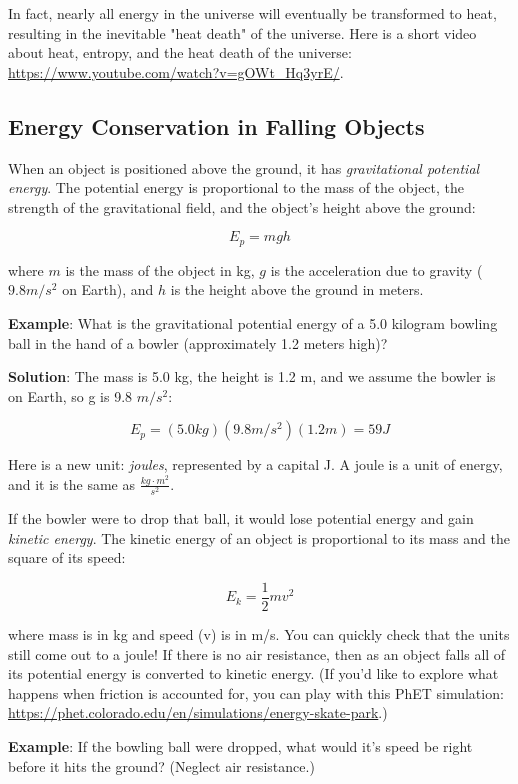 In fact, nearly all energy in the universe will eventually be transformed to heat,
resulting in the inevitable "heat death" of the universe. Here is a short video 
about heat, entropy, and the heat death of the universe: 
\url{https://www.youtube.com/watch?v=gOWt_Hq3yrE/}. 

\subsection{Energy Conservation in Falling Objects}
When an object is positioned above the ground, it has \textit{gravitational 
potential energy}. 
The potential energy is proportional to the mass of the object, the strength of 
the gravitational field, and the object's height above the ground:

$$E_{p} = mgh$$

where $m$ is the mass of the object in kg, $g$ is the acceleration due to gravity 
($9.8 m/s^2$ on Earth), and $h$ is the height above the ground in meters. 

\textbf{Example}: What is the gravitational potential energy of a 5.0 kilogram 
bowling ball in the hand of a bowler (approximately 1.2 meters high)?

\textbf{Solution}: The mass is 5.0 kg, the height is 1.2 m, and we assume the 
bowler is on Earth, so g is 9.8 $m/s^2$:

$$E_{p} = \left( 5.0 kg \right) \left( 9.8 m/s^2 \right) \left( 1.2 m \right) = 59 J$$

Here is a new unit: \textit{joules}, represented by a capital J. A joule is a 
unit of energy, and it is the same as $\frac{kg \cdot m^2}{s^2}$. 

If the bowler were to drop that ball, it would lose potential energy and gain 
\textit{kinetic energy}. The kinetic energy of an object 
is proportional to its mass and the square of its speed:

$$E_{k} = \frac{1}{2}mv^2$$

where mass is in kg and speed (v) is in m/s. You can quickly check that the units 
still come out to a joule! If there is no air resistance, then as an object falls 
all of its potential energy is converted to kinetic energy. (If you'd like to 
explore what happens when friction is accounted for, you can play with this PhET 
simulation: \url{https://phet.colorado.edu/en/simulations/energy-skate-park}.)

\textbf{Example}: If the bowling ball were dropped, what would it's speed be right 
before it hits the ground? (Neglect air resistance.)

